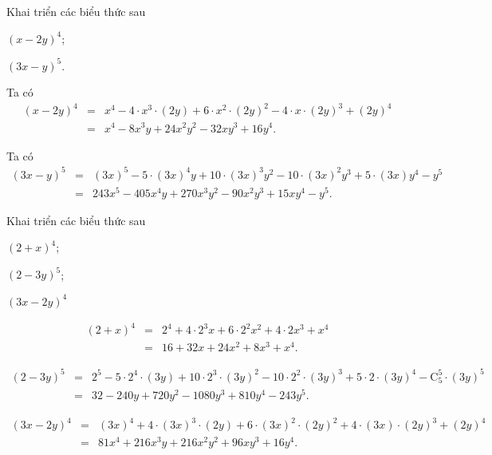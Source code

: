 \begin{vd}%
	Khai triển các biểu thức sau
	\begin{listEX}[2]
		\item $(x-2y)^4$;
		\item $(3x-y)^5$.
	\end{listEX}
	\loigiai
	{
		\begin{listEX}[1]
			\item Ta có
			\begin{eqnarray*}
				(x-2y)^4&=&x^4-4\cdot x^{3}\cdot (2y)+6\cdot x^{2}\cdot (2y)^{2}-4\cdot x\cdot (2y)^{3}+ (2y)^4\\&=&x^4-8x^3y+24x^2y^2-32xy^3+16y^4.
			\end{eqnarray*}
			\item Ta có
			\begin{eqnarray*}
				(3x-y)^5&=&(3x)^5-5\cdot (3x)^{4} y+10\cdot (3x)^{3} y^2-10\cdot (3x)^{2} y^3+5\cdot (3x)y^4- y^5\\&=&243x^5-405x^4y+270x^3y^2-90x^2y^3+15xy^4-y^5.
			\end{eqnarray*}
		\end{listEX}
	}
\end{vd}

\baitaptl
\begin{bt}%
	Khai triển các biểu thức sau
	\begin{listEX}[3]
		\item $(2+x)^4$;
		\item $(2-3y)^5$;
		\item $(3x-2y)^4$
	\end{listEX}
	\loigiai
	{
		\begin{listEX}[1]
			\item \begin{eqnarray*}
				(2+x)^4&=& 2^4+4\cdot 2^3x+6\cdot 2^2x^2+4\cdot 2x^3+ x^4\\&=&16+32x+24x^2+8x^3+x^4.
			\end{eqnarray*}
			\item \begin{eqnarray*}
				(2-3y)^5&=& 2^5-5\cdot 2^4\cdot (3y)+10\cdot 2^3\cdot (3y)^2-10\cdot 2^2\cdot (3y)^3+5\cdot 2\cdot (3y)^4-\mathrm{C}_5^5\cdot (3y)^5\\&=&32-240y+720y^2-1080y^3+810y^4-243y^5.
			\end{eqnarray*}
			\item \begin{eqnarray*}
				(3x-2y)^4&=&(3x)^4+4\cdot (3x)^3\cdot (2y)+6\cdot (3x)^2\cdot (2y)^2+4\cdot (3x)\cdot (2y)^3+(2y)^4\\&=&81x^4+216x^3y+216x^2y^2+96xy^3+16y^4.
			\end{eqnarray*}
		\end{listEX}
	}
\end{bt}

